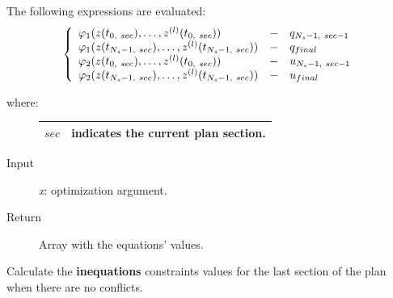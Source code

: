 \documentclass[letterpaper,10pt,english]{sphinxmanual}
\begin{document}
\begin{fulllineitems}
\begin{fulllineitems}
The following expressions are evaluated:
\begin{gather}
\begin{split}\left\lbrace\begin{array}{lcl}
\varphi_1(z(t_{0,\ sec}),\dotsc,z^{(l)}(t_{0,\ sec}))
&-& q_{N_s-1,\ sec-1}\\
\varphi_1(z(t_{N_s-1,\ sec}),\dotsc,z^{(l)}(t_{N_s-1,\ sec}))
&-& q_{final}\\
\varphi_2(z(t_{0,\ sec}),\dotsc,z^{(l)}(t_{0,\ sec}))
&-&u_{N_s-1,\ sec-1}\\
\varphi_2(z(t_{N_s-1,\ sec}),\dotsc,z^{(l)}(t_{N_s-1,\ sec})) &-& u_{final}\\
\end{array}\right.\end{split}\notag
\end{gather}\begin{description}
\item[{where:}] \leavevmode
\begin{tabulary}{\linewidth}{|L|L|}
\hline

\(sec\)
 & 
indicates the current plan section.
\\
\hline\end{tabulary}


\item[{Input}] \leavevmode
\emph{x}: optimization argument.

\item[{Return}] \leavevmode
Array with the equations' values.

\end{description}

\end{fulllineitems}


\begin{fulllineitems}
\label{Multi-robot motion planner:planning_sim.Robot._ls_sa_fieqcons}
Calculate the \textbf{inequations} constraints values for the last section of the plan when
there are no conflicts.


\end{fulllineitems}
\end{fulllineitems}
\end{document}
